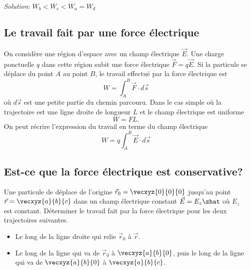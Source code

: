 \textit{Solution}: $W_b < W_c < W_a = W_d$


\subsection*{Le travail fait par une force électrique}


On considère une région d'espace avec un champ électrique $\vec{E}$. Une charge
ponctuelle $q$ dans cette région subit une force électrique $\vec{F} =
q\vec{E}$. Si la particule se déplace du point $A$ au point $B$, le travail
effectué par la force électrique est
\[
  W = \int_A^B \vec{F} \cdot d\vec{s}
\]
où $d\vec{s}$ est une petite partie du chemin parcouru. Dans le cas simple où
la trajectoire est une ligne droite de longueur $L$ et le champ électrique est
uniforme
\[
  W = FL.
\]
On peut récrire l'expression du travail en terme du champ électrique
\[
  W = q \int_A^B \vec{E}\cdot d\vec{s}
\]
\begin{center}
\end{center}


\subsection*{Est-ce que la force électrique est conservative?}


Une particule de déplace de l'origine $\vec{r}_0 = \vecxyz{0}{0}{0}$ jusqu'au
point $\vec{r} = \vecxyz{a}{b}{c}$ dans un champ électrique constant $\vec{E} =
E_z \zhat$ où $E_z$ est constant.  Déterminer le travail fait par la force
électrique pour les deux trajectoires suivantes.

\begin{itemize}
  \item Le long de la ligne droite qui relie $\vec{r}_0$ à $\vec{r}$.
  \item Le long de la ligne qui va de $\vec{r}_0$ à $\vecxyz{a}{b}{0}$, puis le
    long de la ligne qui va de $\vecxyz{a}{b}{0}$ à $\vecxyz{a}{b}{c}$.
\end{itemize}

